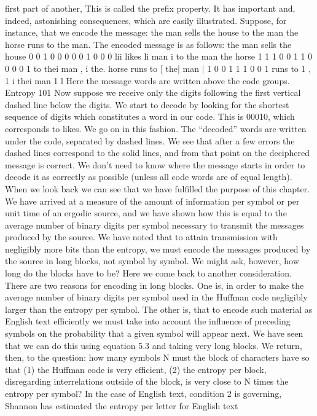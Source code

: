 {{{first part of another, This is called the prefix property. It has
important and, indeed, astonishing consequences, which are easily
illustrated. Suppose, for instance, that we encode the message: the
man sells the house to the man the horse runs to the man. The
encoded message is as follows:
the man sells the house
0 0 1 0 0 0 0 0 1 0 0 0
lii likes li man i
to the man the horse
1 1 1 0 0 1 1 0 0 0 0 1
to thei man , i the. horse
runs to [ the| man |
1 0 0 1 1 1 0 0 1
runs to 1 , 1 i thei man 1 l
Here the message words are written above the code groups.
Entropy 101
Now suppose we receive only the digits following the first vertical
dashed line below the digits. We start to decode by looking for the
shortest sequence of digits which constitutes a word in our code.
This is 00010, which corresponds to likes. We go on in this fashion.
The “decoded” words are written under the code, separated by
dashed lines.
We see that after a few errors the dashed lines correspond to the
solid lines, and from that point on the deciphered message is
correct. We don’t need to know where the message starts in order
to decode it as correctly as possible (unless all code words are of
equal length).
When we look back we can see that we have fulfilled the purpose
of this chapter. We have arrived at a measure of the amount of
information per symbol or per unit time of an ergodic source, and
we have shown how this is equal to the average number of binary
digits per symbol necessary to transmit the messages produced by
the source. We have noted that to attain transmission with negligibly
more bits than the entropy, we must encode the messages
produced by the source in long blocks, not symbol by symbol.
We might ask, however, how long do the blocks have to be? Here
we come back to another consideration. There are two reasons for
encoding in long blocks. One is, in order to make the average
number of binary digits per symbol used in the Huffman code
negligibly larger than the entropy per symbol. The other is, that
to encode such material as English text efficiently we must take
into account the influence of preceding symbols on the probability
that a given symbol will appear next. We have seen that we can
do this using equation 5.3 and taking very long blocks.
We return, then, to the question: how many symbols N must the
block of characters have so that (1) the Huffman code is very
efficient, (2) the entropy per block, disregarding interrelations
outside of the block, is very close to N times the entropy per
symbol? In the case of English text, condition 2 is governing,
Shannon has estimated the entropy per letter for English text
}}}
